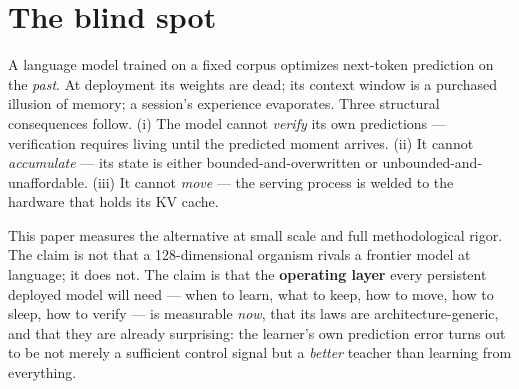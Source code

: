 \documentclass[11pt]{article}
\theoremstyle{definition}
\begin{document}
\begin{abstract}
(chunk,~overlap) points --- layout decoupling exact to 0.0, gradient
exactness gated by warmup \emph{overlap} rather than chunk length; a
two-timescale law from three independent experiments; keyed holographic
recall through silence with a movable persistence knee; collective memory
(one organism's stored surprises cut another's shock-forgetting to
0.67$\times$); and family-generic transfer of the entire operating mode to a
Mamba/S6 parametrization (0.98$\times$). Forty-two predictions were registered
before their data; the falsifications --- a replay-cost law, a rank
hypothesis, two migration thresholds --- are reported at the same strength as
the confirmations, with the numbers that killed them. We argue these
primitives compose into a \textbf{reality prediction engine}: a system that
lives on streams of the present, deposits predictions about its own future at
every horizon, and learns from their arrival --- an axis of capability
orthogonal to parameter scaling, and one on which batch models cannot compete
by construction.
\end{abstract}

\section{The blind spot}

A language model trained on a fixed corpus optimizes next-token prediction on
the \emph{past}. At deployment its weights are dead; its context window is a
purchased illusion of memory; a session's experience evaporates. Three
structural consequences follow. (i) The model cannot \emph{verify} its own
predictions --- verification requires living until the predicted moment
arrives. (ii) It cannot \emph{accumulate} --- its state is either
bounded-and-overwritten or unbounded-and-unaffordable. (iii) It cannot
\emph{move} --- the serving process is welded to the hardware that holds its
KV cache.

This paper measures the alternative at small scale and full methodological
rigor. The claim is not that a 128-dimensional organism rivals a frontier
model at language; it does not. The claim is that the \textbf{operating
layer} every persistent deployed model will need --- when to learn, what to
keep, how to move, how to sleep, how to verify --- is measurable \emph{now},
that its laws are architecture-generic, and that they are already
surprising: the learner's own prediction error turns out to be not merely a
sufficient control signal but a \emph{better} teacher than learning from
everything.
\end{document}
